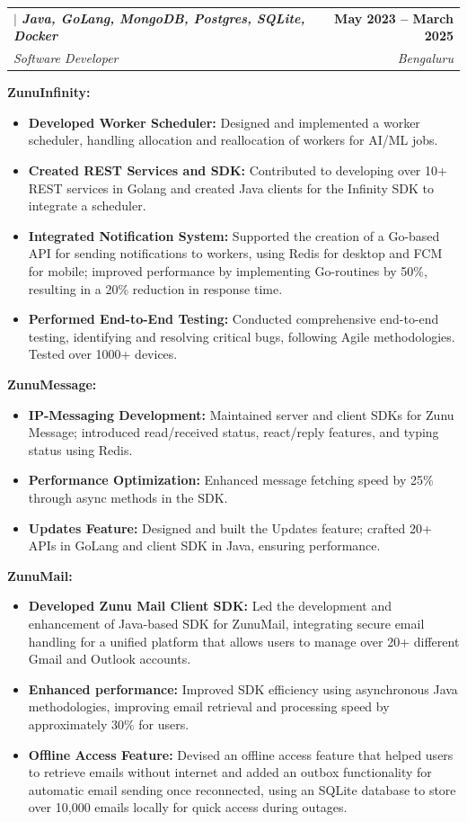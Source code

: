 \documentclass[letterpaper,11pt]{article}
\makeatletter
\newcommand{\resumeItem}[1]{
  \item\small{
    {#1 \vspace{-2pt}}
  }
}
\newcommand{\resumeSubheading}[4]{
  \vspace{-2pt}\item
    \begin{tabular*}{1.0\textwidth}[t]{l@{\extracolsep{\fill}}r}
      \textbf{#1} & \textbf{\small #2} \\
      \textit{\small#3} & \textit{\small #4} \\
    \end{tabular*}\vspace{-7pt}
}
\newcommand{\resumeItemListStart}{\begin{itemize}}
\newcommand{\resumeItemListEnd}{\end{itemize}\vspace{-5pt}}
\makeatother
\begin{document}
    \resumeSubheading
    {{\raisebox{-0.2\height}{\textbf{Ziroh Labs}}} $|$ \emph{Java, GoLang, MongoDB, Postgres, SQLite, Docker}}{May 2023 -- March 2025}
    {Software Developer}{Bengaluru}

    \vspace{1pt}
    \hspace{4mm} \textbf{ZunuInfinity:}
    \vspace{-2mm}
    \resumeItemListStart
      \resumeItem{\textbf{Developed Worker Scheduler:} Designed and implemented a worker scheduler, handling allocation and reallocation of workers for AI/ML jobs.}
      \resumeItem{\textbf{Created REST Services and SDK:} Contributed to developing over 10+ REST services in Golang and created Java clients for the Infinity SDK to integrate a scheduler.}
      \resumeItem{\textbf{Integrated Notification System:} Supported the creation of a Go-based API for sending notifications to workers, using Redis for desktop and FCM for mobile; improved performance by implementing Go-routines by 50\%, resulting in a 20\% reduction in response time.}
      \resumeItem{\textbf{Performed End-to-End Testing:} Conducted comprehensive end-to-end testing, identifying and resolving critical bugs, following Agile methodologies. Tested over 1000+ devices.}
    \resumeItemListEnd

    \vspace{1pt}
    \hspace{4mm} \textbf{ZunuMessage:}
    \vspace{-2mm}
    \resumeItemListStart
      \resumeItem{\textbf{IP-Messaging Development:} Maintained server and client SDKs for Zunu Message; introduced read/received status, react/reply features, and typing status using Redis.}
      \resumeItem{\textbf{Performance Optimization:} Enhanced message fetching speed by 25\% through async methods in the SDK.}
      \resumeItem{\textbf{Updates Feature:} Designed and built the Updates feature; crafted 20+ APIs in GoLang and client SDK in Java, ensuring performance.}
    \resumeItemListEnd

    \vspace{1pt}
    \hspace{4mm} \textbf{ZunuMail:}
    \vspace{-2mm}
    \resumeItemListStart
      \resumeItem{\textbf{Developed Zunu Mail Client SDK:} Led the development and enhancement of Java-based SDK for ZunuMail, integrating secure email handling for a unified platform that allows users to manage over 20+ different Gmail and Outlook accounts.}
      \resumeItem{\textbf{Enhanced performance:} Improved SDK efficiency using asynchronous Java methodologies, improving email retrieval and processing speed by approximately 30\% for users.}
      \resumeItem{\textbf{Offline Access Feature:} Devised an offline access feature that helped users to retrieve emails without internet and added an outbox functionality for automatic email sending once reconnected, using an SQLite database to store over 10,000 emails locally for quick access during outages.}
    \resumeItemListEnd
\end{document}
